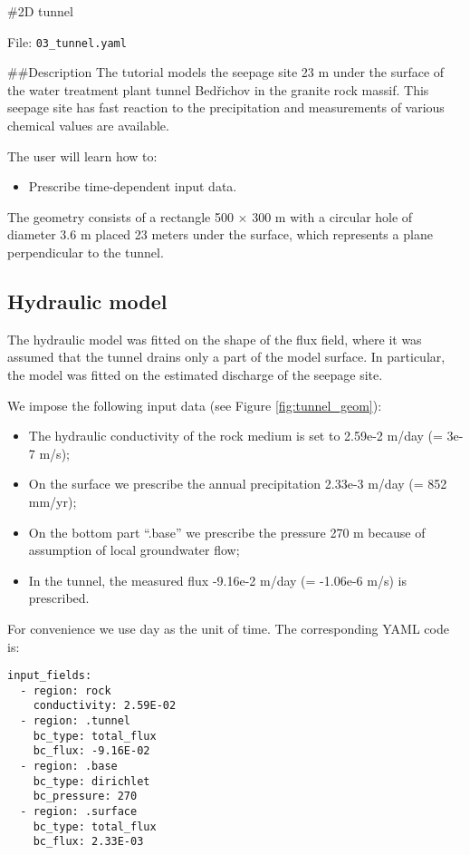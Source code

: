 \#2D tunnel

File: \texttt{03\_tunnel.yaml}

\#\#Description The tutorial models the seepage site 23 m under the
surface of the water treatment plant tunnel Bedřichov in the granite
rock massif. This seepage site has fast reaction to the precipitation
and measurements of various chemical values are available.

The user will learn how to:

\begin{itemize}
\tightlist
\item
  Prescribe time-dependent input data.
\end{itemize}

The geometry consists of a rectangle 500 × 300 m with a circular hole of
diameter 3.6 m placed 23 meters under the surface, which represents a
plane perpendicular to the tunnel.

\subsection{Hydraulic model}

The hydraulic model was fitted on the shape of the flux field, where it
was assumed that the tunnel drains only a part of the model surface. In
particular, the model was fitted on the estimated discharge of the
seepage site.

We impose the following input data (see Figure \ref{fig:tunnel_geom}):

\begin{itemize}
\tightlist
\item
  The hydraulic conductivity of the rock medium is set to 2.59e-2 m/day
  (= 3e-7 m/s);
\item
  On the surface we prescribe the annual precipitation 2.33e-3 m/day (=
  852 mm/yr);
\item
  On the bottom part ``.base'' we prescribe the pressure 270 m because
  of assumption of local groundwater flow;
\item
  In the tunnel, the measured flux -9.16e-2 m/day (= -1.06e-6 m/s) is
  prescribed.
\end{itemize}

For convenience we use day as the unit of time. The corresponding YAML
code is:

\begin{verbatim}
input_fields:
  - region: rock
    conductivity: 2.59E-02
  - region: .tunnel
    bc_type: total_flux
    bc_flux: -9.16E-02
  - region: .base
    bc_type: dirichlet
    bc_pressure: 270
  - region: .surface
    bc_type: total_flux
    bc_flux: 2.33E-03
\end{verbatim}

